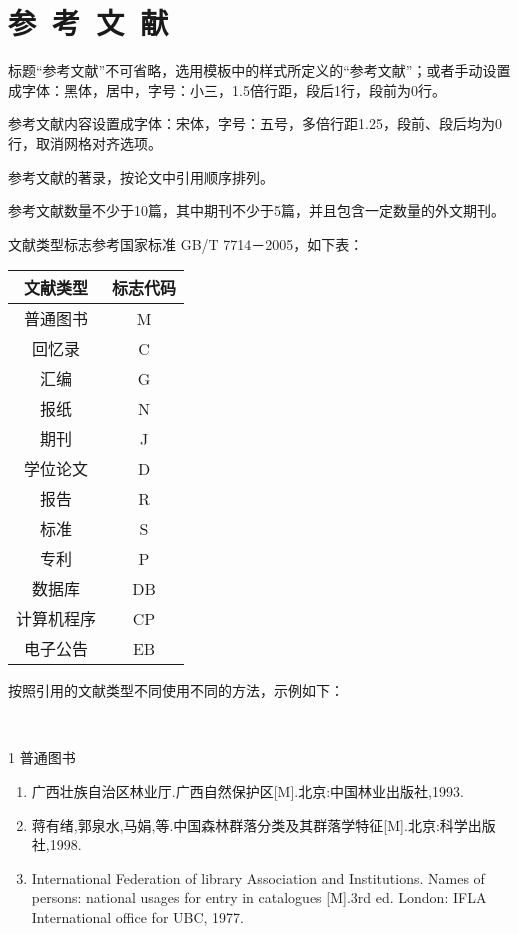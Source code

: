 


\song\wuhao
\setmainfont{宋体}
\linespread{1.25}
\chapter*{\hfill 参~考~文~献 \hfill}
\label{reference}
标题“参考文献”不可省略，选用模板中的样式所定义的“参考文献”；或者手动设置成字体：黑体，居中，字号：小三，1.5倍行距，段后1行，段前为0行。

参考文献内容设置成字体：宋体，字号：五号，多倍行距1.25，段前、段后均为0行，取消网格对齐选项。

参考文献的著录，按论文中引用顺序排列。

参考文献数量不少于10篇，其中期刊不少于5篇，并且包含一定数量的外文期刊。

文献类型标志参考国家标准 GB/T 7714－2005，如下表：


\begin{table}[h]
	\centering
	\begin{tabular}{cc}
	\hline
	文献类型&标志代码\\
	\hline
	普通图书&M\\
	回忆录&C\\
	汇编&G\\
	报纸&N\\
	期刊&J\\
	学位论文&D\\
	报告&R\\
	标准&S\\
	专利&P\\
	数据库&DB\\
	计算机程序&CP\\
	电子公告&EB\\
	\hline
	\end{tabular}
\end{table}

按照引用的文献类型不同使用不同的方法，示例如下：

~\cite[p.~148]{.2019}
~\cite[p.~22]{master1}



1 普通图书
\begin{enumerate}
\item 广西壮族自治区林业厅.广西自然保护区[M].北京:中国林业出版社,1993.
\item 蒋有绪,郭泉水,马娟,等.中国森林群落分类及其群落学特征[M].北京:科学出版社,1998.
\item International Federation of library Association and Institutions. Names of persons: national usages for entry in catalogues [M].3rd ed. London: IFLA International office for UBC, 1977.
\end{enumerate}
\vspace{17.06pt}

